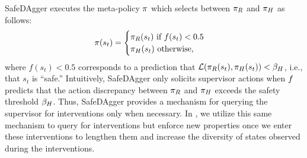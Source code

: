 SafeDAgger executes the meta-policy $\pi$ which selects between $\pi_{R}$ and $\pi_{H}$ as follows:
\begin{align}
    \label{eq:safe_dagger_policy}
    \pi(s_t) =\begin{cases}
            \pi_{R}(s_t) \text{ if } f(s_t) < 0.5 \\
            \pi_{H}(s_t) \text{ otherwise},
          \end{cases}
\end{align}
where $f(s_t) < 0.5$ corresponds to a prediction that $\mathcal{L}(\pi_{R}(s_t), \pi_{H}(s_t)) < \beta_{H}$, i.e., that $s_t$ is ``safe.'' Intuitively, SafeDAgger only solicits supervisor actions when $f$ predicts that the action discrepancy between $\pi_{R}$ and $\pi_{H}$ exceeds the safety threshold $\beta_{H}$. Thus, SafeDAgger provides a mechanism for querying the supervisor for interventions only when necessary. In \algabbr, we utilize this same mechanism to query for interventions but enforce new properties once we enter these interventions to lengthen them and increase the diversity of states observed during the interventions.
